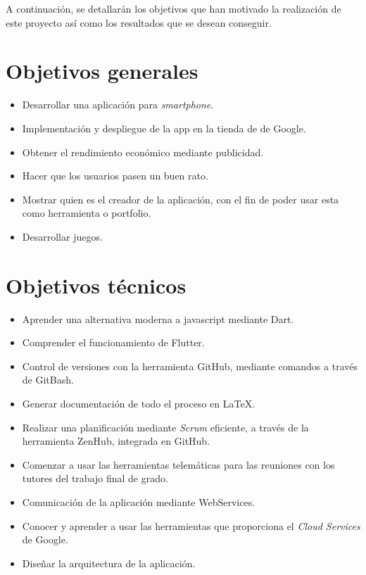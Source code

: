 

A continuación, se detallarán los objetivos que han motivado la realización de este proyecto así como los resultados que se desean conseguir.

\section{Objetivos generales}
\begin{itemize}
	\item Desarrollar una aplicación para \emph{smartphone}.
	\item Implementación y despliegue de la app en la tienda de de Google.
	\item Obtener el rendimiento económico mediante publicidad.
	\item Hacer que los usuarios pasen un buen rato.
	\item Mostrar quien es el creador de la aplicación, con el fin de poder usar esta como herramienta o portfolio.
	\item Desarrollar juegos.
\end{itemize}

\section{Objetivos técnicos}
\begin{itemize}
	\item Aprender una alternativa moderna a javascript mediante Dart.
	\item Comprender el funcionamiento de Flutter.
	\item Control de versiones con la herramienta GitHub, mediante comandos a través de GitBash.
	\item Generar documentación de todo el proceso en \LaTeX.
	\item Realizar una planificación mediante \emph{Scrum} eficiente, a través de la herramienta ZenHub, integrada en GitHub.
	\item Comenzar a usar las herramientas telemáticas para las reuniones con los tutores del trabajo final de grado. 
	\item Comunicación de la aplicación mediante WebServices.
	\item Conocer y aprender a usar las herramientas que proporciona el \emph{Cloud Services} de Google.
	\item Diseñar la arquitectura de la aplicación.
	
\end{itemize}

